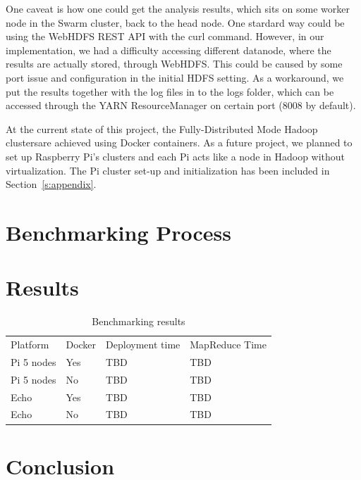 One caveat is how one could get the analysis results, which sits on some 
worker node in the Swarm cluster, back to the head node. One stardard way 
could be using the WebHDFS REST API with the curl command. However, in 
our implementation, we had a difficulty accessing different datanode, where 
the results are actually stored, through WebHDFS. This could be caused by 
some port issue and configuration in the initial HDFS setting. As a 
workaround, we put the results together with the log files in to the logs 
folder, which can be accessed through the YARN ResourceManager on 
certain port (8008 by default).


At the current state of this project, the Fully-Distributed Mode Hadoop 
clustersare achieved using Docker containers. As a future project, we 
planned to set up Raspberry Pi's clusters and each Pi acts like a node in 
Hadoop without virtualization. The Pi cluster set-up and initialization has 
been included in 
Section~\ref{s:appendix}.

\section{Benchmarking Process}\label{s:benchrproc}


\section{Results}\label{s:results}

\begin{table}[hbt]
\centering
\caption{Benchmarking results}\label{t:results-table}
\begin{tabular}{llll}
Platform    & Docker & Deployment time & MapReduce Time \\
Pi 5 nodes  & Yes    & TBD             & TBD            \\
Pi 5 nodes  & No     & TBD             & TBD            \\
Echo        & Yes    & TBD             & TBD            \\
Echo        & No     & TBD             & TBD            \\
\end{tabular}
\end{table}



\section{Conclusion}\label{s:conclusion}

